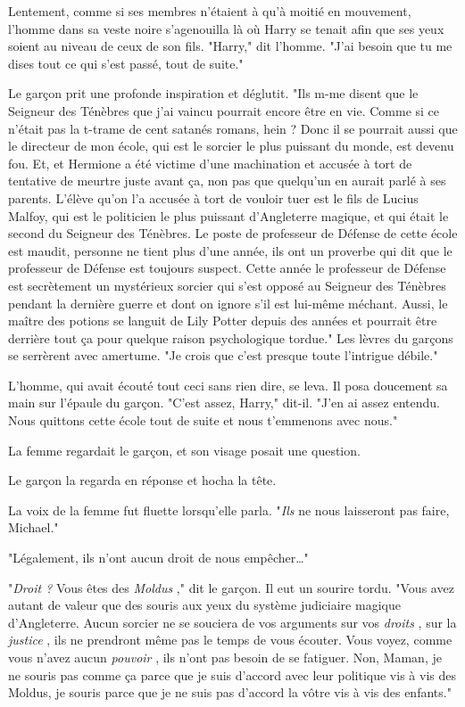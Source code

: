 Lentement, comme si ses membres n'étaient à qu'à moitié en mouvement, l'homme dans sa veste noire s'agenouilla là où Harry se tenait afin que ses yeux soient au niveau de ceux de son fils. "Harry," dit l'homme. "J'ai besoin que tu me dises tout ce qui s'est passé, tout de suite."

Le garçon prit une profonde inspiration et déglutit. "Ils m-me disent que le Seigneur des Ténèbres que j'ai vaincu pourrait encore être en vie. Comme si ce n'était pas la t-trame de cent satanés romans, hein ? Donc il se pourrait aussi que le directeur de mon école, qui est le sorcier le plus puissant du monde, est devenu fou. Et, et Hermione a été victime d'une machination et accusée à tort de tentative de meurtre juste avant ça, non pas que quelqu'un en aurait parlé à ses parents. L'élève qu'on l'a accusée à tort de vouloir tuer est le fils de Lucius Malfoy, qui est le politicien le plus puissant d'Angleterre magique, et qui était le second du Seigneur des Ténèbres. Le poste de professeur de Défense de cette école est maudit, personne ne tient plus d'une année, ils ont un proverbe qui dit que le professeur de Défense est toujours suspect. Cette année le professeur de Défense est secrètement un mystérieux sorcier qui s'est opposé au Seigneur des Ténèbres pendant la dernière guerre et dont on ignore s'il est lui-même méchant. Aussi, le maître des potions se languit de Lily Potter depuis des années et pourrait être derrière tout ça pour quelque raison psychologique tordue." Les lèvres du garçons se serrèrent avec amertume. "Je crois que c'est presque toute l'intrigue débile."

L'homme, qui avait écouté tout ceci sans rien dire, se leva. Il posa doucement sa main sur l'épaule du garçon. "C'est assez, Harry," dit-il. "J'en ai assez entendu. Nous quittons cette école tout de suite et nous t'emmenons avec nous."

La femme regardait le garçon, et son visage posait une question.

Le garçon la regarda en réponse et hocha la tête.

La voix de la femme fut fluette lorsqu'elle parla. "\emph{Ils}  ne nous laisseront pas faire, Michael."

"Légalement, ils n'ont aucun droit de nous empêcher…"

"\emph{Droit ?}  Vous êtes des \emph{Moldus} ," dit le garçon. Il eut un sourire tordu. "Vous avez autant de valeur que des souris aux yeux du système judiciaire magique d'Angleterre. Aucun sorcier ne se souciera de vos arguments sur vos \emph{droits} , sur la \emph{justice} , ils ne prendront même pas le temps de vous écouter. Vous voyez, comme vous n'avez aucun \emph{pouvoir} , ils n'ont pas besoin de se fatiguer. Non, Maman, je ne souris pas comme ça parce que je suis d'accord avec leur politique vis à vis des Moldus, je souris parce que je ne suis pas d'accord la vôtre vis à vis des enfants."

